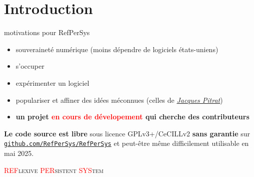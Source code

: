 \documentclass[final,a4,xcolor={svgnames,dvipsnames}]{beamer}
\begin{document}
 \section{Introduction}
 \label{sec:intro}
 
 \begin{frame}{motivations pour RefPerSys}

   \begin{itemize}
   \item souveraineté numérique \small{(moins dépendre de logiciels
     états-uniens)}
   \item s'occuper 
   \item expérimenter un logiciel
   \item populariser et affiner des idées méconnues (celles de
     \href{https://fr.wikipedia.org/wiki/Jacques_Pitrat}{\it Jacques
       Pitrat})
   \item \textbf{un projet \textcolor{red}{en cours de dévelopement} qui cherche des contributeurs}
   \end{itemize}

   \bigskip
   \textbf{Le code source est libre} sous licence GPLv3+/CeCILLv2
   \textbf{sans garantie} sur
   \href{https://github.com/RefPerSys/RefPerSys}{\texttt{github.com/RefPerSys/RefPerSys}}
   et peut-être même difficilement utilisable en mai 2025.

   \bigskip

   \begin{center}
     \large\textsc{\textcolor{red}{REF}lexive \textcolor{red}{PER}sistent \textcolor{red}{SYS}tem}
   \end{center}
 \end{frame}
 
\end{document}

